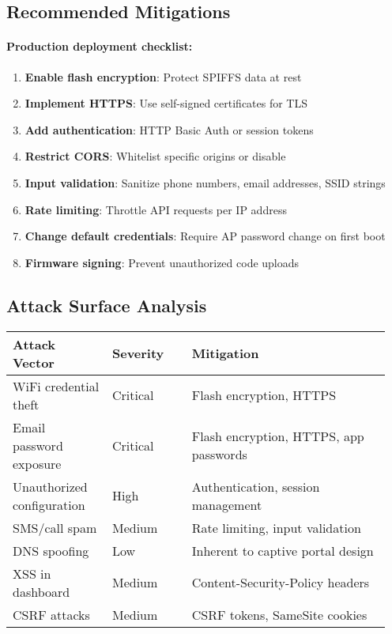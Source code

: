 \documentclass[11pt,a4paper]{article}
\begin{document}
\subsection{Recommended Mitigations}

\paragraph{Production deployment checklist:}
\begin{enumerate}[leftmargin=*]
  \item \textbf{Enable flash encryption}: Protect SPIFFS data at rest
  \item \textbf{Implement HTTPS}: Use self-signed certificates for TLS
  \item \textbf{Add authentication}: HTTP Basic Auth or session tokens
  \item \textbf{Restrict CORS}: Whitelist specific origins or disable
  \item \textbf{Input validation}: Sanitize phone numbers, email addresses, SSID strings
  \item \textbf{Rate limiting}: Throttle API requests per IP address
  \item \textbf{Change default credentials}: Require AP password change on first boot
  \item \textbf{Firmware signing}: Prevent unauthorized code uploads
\end{enumerate}

\subsection{Attack Surface Analysis}

\begin{longtable}{>{\raggedright\arraybackslash}p{0.25\linewidth} p{0.2\linewidth} p{0.5\linewidth}}
\hline
\textbf{Attack Vector} & \textbf{Severity} & \textbf{Mitigation} \\
\hline
\endhead
WiFi credential theft & Critical & Flash encryption, HTTPS \\
Email password exposure & Critical & Flash encryption, HTTPS, app passwords \\
Unauthorized configuration & High & Authentication, session management \\
SMS/call spam & Medium & Rate limiting, input validation \\
DNS spoofing & Low & Inherent to captive portal design \\
XSS in dashboard & Medium & Content-Security-Policy headers \\
CSRF attacks & Medium & CSRF tokens, SameSite cookies \\
\hline
\end{longtable}
\end{document}
